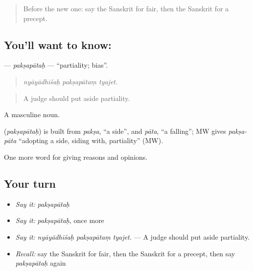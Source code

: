 \label{lesson:SA-C348-paksapatah}



\begin{quote}
Before the new one: say the Sanskrit for fair, then the Sanskrit for a precept.
\end{quote}

\subsection*{You'll want to know: }
\textbf{} — \emph{pakṣapātaḥ} — \textquotedblleft{}partiality; bias\textquotedblright{}.

\begin{quote}
  
\end{quote}

\begin{quote}
\emph{nyāyādhīśaḥ pakṣapātaṃ tyajet.}
\end{quote}

\begin{quote}
A judge should put aside partiality.
\end{quote}

A masculine noun.

\begin{cousinweb}
\textbf{} (\emph{pakṣapātaḥ}) is built from \emph{pakṣa}, \textquotedblleft{}a side\textquotedblright{}, and \emph{pāta}, \textquotedblleft{}a falling\textquotedblright{}; MW gives \emph{pakṣa-pāta} \textquotedblleft{}adopting a side, siding with, partiality\textquotedblright{} (MW).
\end{cousinweb}

\begin{grammarlens}[title={What you've built}]
One more word for giving reasons and opinions.
\end{grammarlens}

\subsection*{Your turn}
\begin{itemize}
\raggedright
  \item \emph{Say it:} \emph{pakṣapātaḥ}
  \item \emph{Say it:} \emph{pakṣapātaḥ}, once more
  \item \emph{Say it:} \emph{nyāyādhīśaḥ pakṣapātaṃ tyajet.} — A judge should put aside partiality.
  \item \emph{Recall:} say the Sanskrit for fair, then the Sanskrit for a precept, then say \emph{pakṣapātaḥ} again
\end{itemize}

